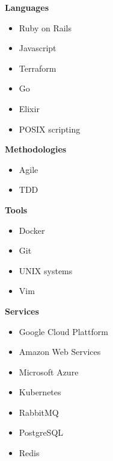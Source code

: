 \documentclass[9pt]{template} %
\begin{document}
\begin{minipage}[t]{0.3\textwidth} %
  \vspace{-\baselineskip}

  \textbf{Languages}
  \begin{itemize}
      \item Ruby on Rails
      \item Javascript
      \item Terraform
      \item Go
      \item Elixir
      \item POSIX scripting
  \end{itemize}
\end{minipage}
\hfill
\begin{minipage}[t]{0.3\textwidth}
  \vspace{-\baselineskip}

  \textbf{Methodologies}
  \begin{itemize}
      \item Agile
      \item TDD
  \end{itemize}

  \textbf{Tools}
  \begin{itemize}
      \item Docker
      \item Git
      \item UNIX systems
      \item Vim
  \end{itemize}
\end{minipage}
\hfill
\begin{minipage}[t]{0.3\textwidth}
  \vspace{-\baselineskip}

  \textbf{Services}
  \begin{itemize}
      \item Google Cloud Plattform
      \item Amazon Web Services
      \item Microsoft Azure
      \item Kubernetes
      \item RabbitMQ
      \item PostgreSQL
      \item Redis
  \end{itemize}
\end{minipage}

\end{document}
